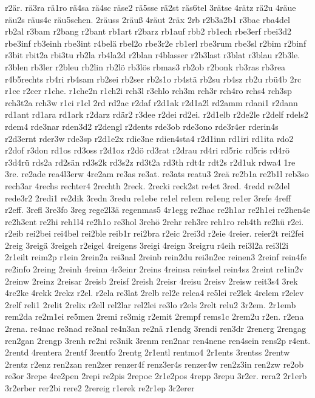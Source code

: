 {r2är.
rä3ra
rä1ro
rä4sa
rä4sc
räse2
rä5sse
rä2st
räs6tel
3rätse
4rätz
rä2u
4räue
räu2s
räus4c
räu5schen.
2räuss
2räuß
4räut
2räx
2rb
r2b3a2b1
r3bac
rba4del
rb2al
r3bam
r2bang
r2bant
rb1art
r2barz
rb1auf
rbb2
rb1ech
rbe3erf
rbei3d2
rbe3inf
rb3einh
rbe3int
r4belä
rbel2o
rbe3r2e
rb1erl
rbe3rum
rbe3sl
r2bim
r2binf
r3bit
rbit2a
rbi3tu
rb2la
rb4la2d
r2blan
r4blasser
r2b3last
r3blat
r3blau
r2b3le.
r3blen
rb3ler
r2bleu
rb2lin
rb2lö
rb3lös
rbmas3
rb2ob
r2bonk
rb3ras
rb3rea
r4b5rechts
rb4ri
rb4sam
rb2sei
rb2ser
rb2s1o
rb4stä
rb2su
rb4sz
rb2u
rbü4b
2rc
r1ce
r2cer
r1che.
r1che2n
r1ch2i
rch3l
r3chlo
rch3m
rch3r
rch4ro
rchs4
rch3sp
rch3t2a
rch3w
r1ci
r1cl
2rd
rd2ac
r2daf
r2d1ak
r2d1a2l
rd2amm
rdani1
r2dann
rd1ant
rd1ara
rd1ark
r2darz
rdär2
r3dee
r2dei
rd2ei.
r2d1elb
r2de2le
r2delf
rdels2
rdem4
rde3nar
rden3d2
r2dengl
r2dents
rde3ob
rde3ono
rde3r4er
rderin4s
r2d3ernt
rder3w
rde3sp
r2d1e2x
rdie3ne
rdien4sta4
r2d1inn
rd1iri
rd1ita
rdo2
r2dof
r3don
rd1os
rd3oss
r2d1oz
r2dö
rd3rat
r2drau
rd4ri
rd5ric
rd5ris
rd4rö
r3d4rü
rds2a
rd2sän
rd3s2k
rd3s2z
rd3t2a
rd3th
rdt4r
rdt2s
r2d1uk
rdwa4
1re
3re.
re2ade
rea4l3erw
4re2am
re3as
re3at.
re3ats
reatu3
2reä
re2b1a
re2b1l
reb3so
rech3ar
4rechs
rechter4
2rechth
2reck.
2recki
reck2st
re4ct
3red.
4redd
re2del
rede3r2
2redi1
re2dik
3redn
3redu
re1ebe
re1el
re1em
re1eng
re1er
3refe
4reff
r2eff.
3refl
3re3fo
3reg
rege2l3ä
regenmas5
4r1egg
re2hac
re2h1ar
re2h1ei
re2hen4e
re2h3ent
re2hi
reh1l4
re2h1o
re3hol
3rehö
2rehr
reh3re
reh1ro
reh4th
re2hü
r2ei.
r2eib
rei2bei
rei4bel
rei2ble
reib1r
rei2bra
r2eic
2rei3d
r2eie
4reier.
reier2t
rei2fei
2reig
3reigä
3reigeh
r2eigel
4reigens
3reigi
4reign
3reigru
r4eih
rei3l2a
rei3l2i
2r1eilt
reim2p
r1ein
2rein2a
rei3nal
2reinb
rein2du
rei3n2ec
reinen3
2reinf
rein4fe
re2info
2reing
2reinh
4reinn
4r3einr
2reins
4reinsa
rein4sel
rein4sz
2reint
re1in2v
2reinw
2reinz
2reisar
2reisb
2reisf
2reish
2reisr
4reisu
2reisv
2reisw
reit3s4
3rek
4re2ke
4rekk
2rekz
r2el.
r2ela
re3lat
2relb
rel2e
relea4
re5lei
re2lek
4relem
r2elev
2relf
reli1
2relit
2relix
r2ell
rel2lar
rel2lei
re3lo
r2els
2relt
relu2
3r2em.
2r1emb
rem2da
re2m1ei
re5men
2remi
re3mig
r2emit
2rempf
rems1c
2rem2u
r2en.
r2ena
2rena.
re4nac
re3nad
re3nal
re4n3an
re2nä
r1endg
3rendi
ren3dr
2renerg
2rengag
ren2gan
2rengp
3renh
re2ni
re3nik
3renm
ren2nar
ren4nene
ren4sein
rens2p
r4ent.
2rentd
4rentera
2rentf
3rentfo
2rentg
2r1entl
rentmo4
2r1ents
3rentss
2rentw
2rentz
r2enz
ren2zan
ren2zer
renzer4f
renz3er4s
renzer4w
ren2z3in
ren2zw
re2ob
re3or
3repe
4re2pen
2repi
re2pis
2repoc
2r1e2pos
4repp
3repu
3r2er.
rera2
2r1erb
3r2erber
rer2bi
rere2
2rereig
r1erek
re2r1ep
3r2erer
}

